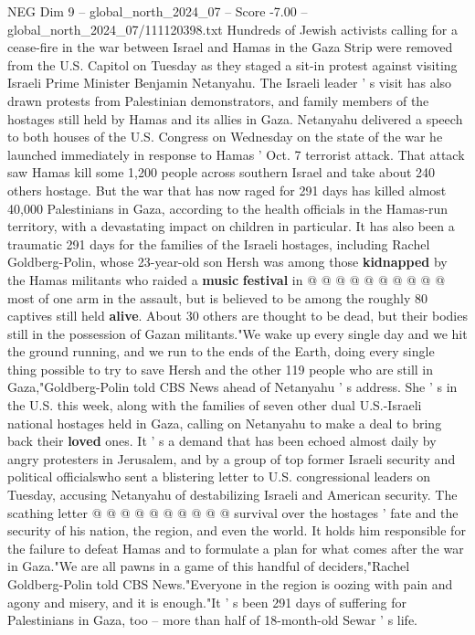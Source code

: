 \begin{textsample}{NEG Dim 9 – global\_north\_2024\_07 – Score -7.00 – global\_north\_2024\_07/111120398.txt}  \label{ex:f9_neg_159}
Hundreds of Jewish activists calling for a cease-fire in the war between Israel and Hamas in the Gaza Strip were removed from the U.S.
Capitol on Tuesday as they staged a sit-in protest against visiting Israeli Prime Minister Benjamin Netanyahu.
The Israeli leader ' s visit has also drawn protests from Palestinian demonstrators, and family members of the hostages still held by Hamas and its allies in Gaza.
Netanyahu delivered a speech to both houses of the U.S.
Congress on Wednesday on the state of the war he launched immediately in response to Hamas ' Oct. 7 terrorist attack.
That attack saw Hamas kill some 1,200 people across southern Israel and take about 240 others hostage.
But the war that has now raged for 291 days has killed almost 40,000 Palestinians in Gaza, according to the health officials in the Hamas-run territory, with a devastating impact on children in particular.
It has also been a traumatic 291 days for the families of the Israeli hostages, including Rachel Goldberg-Polin, whose 23-year-old son Hersh was among those \textbf{kidnapped} by the Hamas militants who raided a \textbf{music} \textbf{festival} in @ @ @ @ @ @ @ @ @ @ most of one arm in the assault, but is believed to be among the roughly 80 captives still held \textbf{alive}.
About 30 others are thought to be dead, but their bodies still in the possession of Gazan militants."We wake up every single day and we hit the ground running, and we run to the ends of the Earth, doing every single thing possible to try to save Hersh and the other 119 people who are still in Gaza,"Goldberg-Polin told CBS News ahead of Netanyahu ' s address.
She ' s in the U.S. this week, along with the families of seven other dual U.S.-Israeli national hostages held in Gaza, calling on Netanyahu to make a deal to bring back their \textbf{loved} ones.
It ' s a demand that has been echoed almost daily by angry protesters in Jerusalem, and by a group of top former Israeli security and political officialswho sent a blistering letter to U.S. congressional leaders on Tuesday, accusing Netanyahu of destabilizing Israeli and American security.
The scathing letter @ @ @ @ @ @ @ @ @ @ survival over the hostages ' fate and the security of his nation, the region, and even the world.
It holds him responsible for the failure to defeat Hamas and to formulate a plan for what comes after the war in Gaza."We are all pawns in a game of this handful of deciders,"Rachel Goldberg-Polin told CBS News."Everyone in the region is oozing with pain and agony and misery, and it is enough."It ' s been 291 days of suffering for Palestinians in Gaza, too -- more than half of 18-month-old Sewar ' s life.

\end{textsample}
